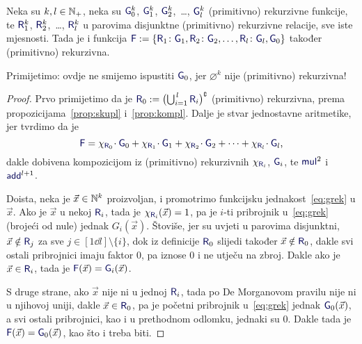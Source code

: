 \begin{teorem}\label{tm:grek}
Neka su $k,l\in{\mathbb N}_+$, neka su $\f G_0^k$, $\f G_1^k$, $\f G_2^k$,~\ldots, $\f G_l^k$ (primitivno) rekurzivne funkcije, te $\f R_1^k$, $\f R_2^k$,~\ldots, $\f R_l^k$ u parovima disjunktne (primitivno) rekurzivne relacije, sve iste mjesnosti. Tada je i funkcija $\f F:=\{\f R_1\colon\f G_1,\f R_2\colon\f G_2,\dotsc,\f R_l\colon\f G_l,\f G_0\}$ također (primitivno) rekurzivna.
\end{teorem}

Primijetimo: ovdje ne smijemo ispustiti $\f G_0$, jer $\varnothing^k$ nije (primitivno) rekurzivna!

\begin{proof}
Prvo primijetimo da je $\f R_0:=\bigl(\bigcup\nolimits_{i=1}^{\,l}\f R_i\bigr)\kompl$ (primitivno) rekurzivna, prema propozicijama~\ref{prop:skupl} i~\ref{prop:kompl}. Dalje je stvar jednostavne aritmetike, jer tvrdimo da je
\begin{equation}\label{eq:grek}
    \f F=\chi_{\f R_0}\!\cdot \f G_0+\chi_{\f R_1}\!\cdot \f G_1+\chi_{\f R_2}\!\cdot \f G_2+\dotsb+\chi_{\f R_l}\!\cdot\f G_l\text,
\end{equation}
dakle dobivena kompozicijom iz (primitivno) rekurzivnih $\chi_{\f R_i}$, $\f G_i$, te $\f{mul}^2$ i $\f{add}^{l+1}$.

    Doista, neka je $\vec x\in{\mathbb N}^k$ proizvoljan, i promotrimo funkcijsku jednakost~\eqref{eq:grek} u $\vec x$. Ako je $\vec x$ u nekoj $\f R_i$, tada je $\chi_{\f R_i}(\vec x)=1$, pa je $i$-ti pribrojnik u~\eqref{eq:grek} (brojeći od nule) jednak $G_i(\vec x)$. Štoviše, jer su uvjeti u parovima disjunktni, $\vec x\notin\f R_j$ za sve $j\in[1\dd l]\setminus\{i\}$, dok iz definicije $\f R_0$ slijedi također $\vec x\notin\f R_0$, dakle svi ostali pribrojnici imaju faktor $0$, pa iznose $0$ i ne utječu na zbroj. Dakle ako je $\vec x\in\f R_i$, tada je $\f F(\vec x)=\f G_i(\vec x)$.

S druge strane, ako $\vec x$ nije ni u jednoj $\f R_i$, tada po De Morganovom pravilu nije ni u njihovoj uniji, dakle $\vec x\in\f R_0$, pa je početni pribrojnik u~\eqref{eq:grek} jednak $\f G_0(\vec x)$, a svi ostali pribrojnici, kao i u prethodnom odlomku, jednaki su $0$. Dakle tada je $\f F(\vec x)=\f G_0(\vec x)$, kao što i treba biti.
\end{proof}

